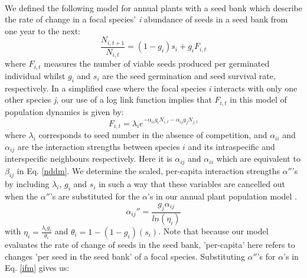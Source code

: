 \documentclass[a4,12pt]{article}
\begin{document}
        \paragraph{} 
        We defined the following model for annual plants with a seed bank \parencite{Levine2009, Mayfield2017, Bimler2018} which describe the rate of change in a focal species' \textit{i} abundance of seeds in a seed bank from one year to the next: 
            \begin{equation}
                \frac{N_{i, t+1}}{N_{i, t}} = \left( 1 - g_{i} \right) s_{i} + g_{i}F_{i, t}
                \label{ifm}
            \end{equation}
        where \(F_{i,t}\) measures the number of viable seeds produced per germinated individual whilst \(g_{i}\) and \(s_{i}\) are the seed germination and seed survival rate, respectively. In a simplified case where the focal species \textit{i} interacts with only one other species \textit{j}, our use of a log link function implies that \(F_{i,t}\) in this model of population dynamics is given by:
            \begin{equation}
                F_{i,t} = \lambda_{i} e^{- \alpha_{ii} g_{i} N_{i, t} -  \alpha_{ij} g_{j} N_{j, t} }
                \label{fecundity}   
            \end{equation}
        where \(\lambda_{i}\) corresponds to seed number in the absence of competition, and \(\alpha_{ii}\) and \(\alpha_{ij}\) are the interaction strengths between species \(i\) and its intraspecific and interspecific neighbours respectively. Here it is \(\alpha_{ij}\) and \(\alpha_{ii}\) which are equivalent to \(\beta_{ij}\) in Eq. \ref{nddm}. 
        We determine the scaled, per-capita interaction strengths ${\alpha}''$'s by including \(\lambda_{i}\), \(g_{i}\) and \(s_{i}\) in such a way that these variables are cancelled out when the ${\alpha}''$'s are substituted for the $\alpha$'s in our annual plant population model \parencite{Godoy2014, Bimler2018}. 
        \begin{equation}
            {\alpha_{ij}}'' = \frac{g_{j} \alpha_{ij}}{ln(\eta_{i})}
        \end{equation}
        with $\eta_{i} = \frac{\lambda_{i} g_{i}}{\theta_{i}}$ and $\theta_{i} = 1 - (1 - g_{i})(s_{i})$. %
        Note that because our model evaluates the rate of change of seeds in the seed bank, 'per-capita' here refers to changes 'per seed in the seed bank' of a focal species. Substituting ${\alpha}''$'s for $\alpha$'s in Eq. \ref{ifm} gives us: 
    
\end{document}
